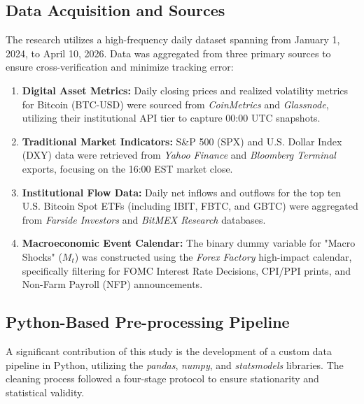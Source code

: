 \documentclass[10pt, conference, compsocconf]{IEEEtran}
\begin{document}
\subsection{Data Acquisition and Sources}

The research utilizes a high-frequency daily dataset spanning from January 1, 2024, to April 10, 2026. Data was aggregated from three primary sources to ensure cross-verification and minimize tracking error:

\begin{enumerate}
    \item \textbf{Digital Asset Metrics:} Daily closing prices and realized volatility metrics for Bitcoin (BTC-USD) were sourced from \textit{CoinMetrics} and \textit{Glassnode}, utilizing their institutional API tier to capture 00:00 UTC snapshots.
    \item \textbf{Traditional Market Indicators:} S\&P 500 (SPX) and U.S. Dollar Index (DXY) data were retrieved from \textit{Yahoo Finance} and \textit{Bloomberg Terminal} exports, focusing on the 16:00 EST market close.
    \item \textbf{Institutional Flow Data:} Daily net inflows and outflows for the top ten U.S. Bitcoin Spot ETFs (including IBIT, FBTC, and GBTC) were aggregated from \textit{Farside Investors} and \textit{BitMEX Research} databases.
    \item \textbf{Macroeconomic Event Calendar:} The binary dummy variable for "Macro Shocks" ($M_t$) was constructed using the \textit{Forex Factory} high-impact calendar, specifically filtering for FOMC Interest Rate Decisions, CPI/PPI prints, and Non-Farm Payroll (NFP) announcements.
\end{enumerate}


\subsection{Python-Based Pre-processing Pipeline}

A significant contribution of this study is the development of a custom data pipeline in Python, utilizing the \textit{pandas}, \textit{numpy}, and \textit{statsmodels} libraries. The cleaning process followed a four-stage protocol to ensure stationarity and statistical validity.
\end{document}
